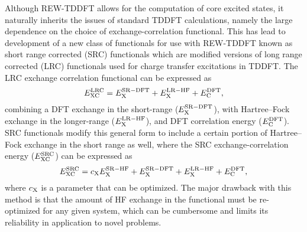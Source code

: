 \documentclass{article}
\begin{document}
Although REW-TDDFT allows for the computation of core excited states, it naturally inherits the issues of standard TDDFT calculations, namely the large dependence on the choice of exchange-correlation functional. This has lead to development of a new class of functionals for use with REW-TDDFT known as short range corrected (SRC) functionals which are modified versions of long range corrected (LRC) functionals used for charge transfer excitations in TDDFT. The LRC exchange correlation functional can be expressed as
\begin{equation}
E^{\rm LRC}_{\rm XC} = E^{\rm SR-DFT}_{\rm X} + E^{\rm LR-HF}_{\rm X} + E^{\rm DFT}_{\rm C},
\end{equation}
combining a DFT exchange in the short-range ($E^{\rm SR-DFT}_{\rm X}$), with Hartree--Fock exchange in the longer-range ($E^{\rm LR-HF}_{\rm X}$), and DFT correlation energy ($E^{\rm DFT}_{\rm C}$). SRC functionals modify this general form to include a certain portion of Hartree--Fock exchange in the short range as well, where the SRC exchange-correlation energy ($E^{\rm SRC}_{\rm XC}$) can be expressed as
\begin{equation}
E^{\rm SRC}_{\rm XC} = c_{\rm X}E^{\rm SR-HF}_{\rm X} + E^{\rm SR-DFT}_{\rm X} + E^{\rm LR-HF}_{\rm X} + E^{\rm DFT}_{\rm C}, 
\end{equation}
where $c_{\rm X}$ is a parameter that can be optimized. The major drawback with this method is that the amount of HF exchange in the functional must be re-optimized for any given system, which can be cumbersome and limits its reliability in application to novel problems. 
\end{document}
